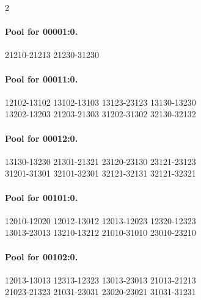 \documentclass[11pt]{article}
\numberwithin{equation}{section}
\numberwithin{table}{section}
\begin{document}
\begin{multicols}{2}
\paragraph{Pool for 00001:0.}
\begingroup\footnotesize\ttfamily\begin{flushleft}
21210-21213 21230-31230\\
\end{flushleft}\endgroup
\paragraph{Pool for 00011:0.}
\begingroup\footnotesize\ttfamily\begin{flushleft}
12102-13102 13102-13103 13123-23123 13130-13230\\
13202-13203 21203-21303 31202-31302 32130-32132\\
\end{flushleft}\endgroup
\paragraph{Pool for 00012:0.}
\begingroup\footnotesize\ttfamily\begin{flushleft}
13130-13230 21301-21321 23120-23130 23121-23123\\
31201-31301 32101-32301 32121-32131 32121-32321\\
\end{flushleft}\endgroup
\paragraph{Pool for 00101:0.}
\begingroup\footnotesize\ttfamily\begin{flushleft}
12010-12020 12012-13012 12013-12023 12320-12323\\
13013-23013 13210-13212 21010-31010 23010-23210\\
\end{flushleft}\endgroup
\paragraph{Pool for 00102:0.}
\begingroup\footnotesize\ttfamily\begin{flushleft}
12013-13013 12313-12323 13013-23013 21013-21213\\
21023-21323 21031-23031 23020-23021 31031-31231\\
\end{flushleft}\endgroup

\end{multicols}
\end{document}

